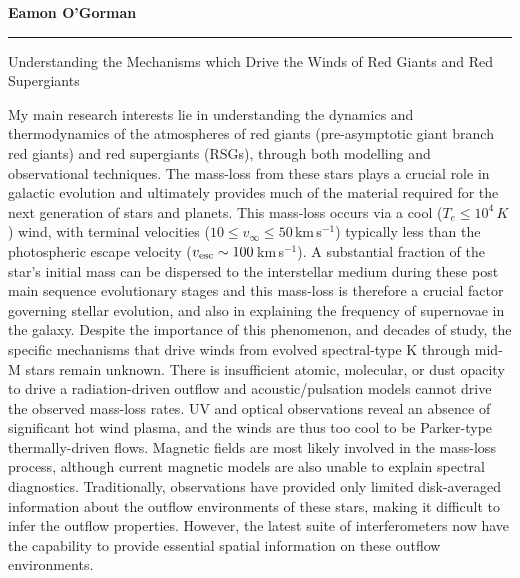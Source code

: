 \documentclass[11pt]{letter} %
\begin{document}




\begin{flushleft}
{\large\bf Eamon O'Gorman}
\end{flushleft}
\medskip\hrule height 1pt
\begin{flushright}


\end{flushright} 
{\Large 
\begin{center}
Understanding the Mechanisms which Drive the Winds of Red Giants and Red Supergiants
\end{center}
}

My main research interests lie in understanding the dynamics and thermodynamics of the atmospheres of red giants (pre-asymptotic giant branch red giants) and red supergiants (RSGs), through both modelling and observational techniques. The mass-loss from these stars plays a crucial role in galactic evolution and ultimately provides much of the material required for the next generation of stars and planets. This mass-loss occurs via a cool ($T_{e} \leq 10^4\,K$) wind, with terminal velocities ($10 \leq v_{\infty} \leq 50$\,km\,s$^{-1}$) typically less than the photospheric escape velocity ($v_{\rm{esc}} \sim 100$\,km\,s$^{-1}$). A substantial fraction of the star's initial mass can be dispersed to the interstellar medium during these post main sequence evolutionary stages and this mass-loss is therefore a crucial factor governing stellar evolution, and also in explaining the frequency of supernovae in the galaxy. Despite the importance of this phenomenon, and decades of study, the specific mechanisms that drive winds from evolved spectral-type K through mid-M stars remain unknown. There is insufficient atomic, molecular, or dust opacity to drive a radiation-driven outflow and acoustic/pulsation models cannot drive the observed mass-loss rates. UV and optical observations reveal an absence of significant hot wind plasma, and the winds are thus too cool to be Parker-type thermally-driven flows. Magnetic fields are most likely involved in the mass-loss process, although current magnetic models are also unable to explain spectral diagnostics. Traditionally, observations have provided only limited disk-averaged information about the outflow environments of these stars, making it difficult to infer the outflow properties. However, the latest suite of interferometers now have the capability to provide essential spatial information on these outflow environments.
\end{document}
